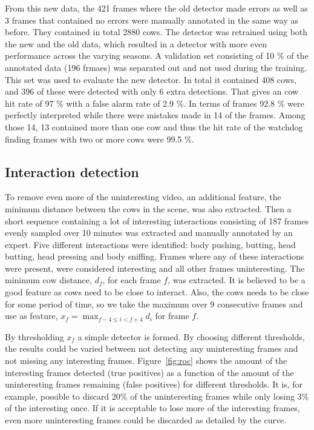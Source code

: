 \documentclass{IET}
\begin{document}
From this new data, the 421 frames where the old detector made errors as well as 3 frames that contained no errors were manually annotated in the same way as before. They contained in total 2880 cows. The detector was retrained using both the new and the old data, which resulted in a detector with more even performance across the varying seasons. A validation set consisting of 10 \% of the annotated data (196 frmaes) was separated out and not used during the training. This set was used to evaluate the new detector. In total it contained 408 cows, and 396 of these were detected with only 6 extra detections. That gives an cow hit rate of 97 \% with a false alarm rate of 2.9 \%. In terms of frames 92.8 \% were perfectly interpreted while there were mistakes made in 14 of the frames. Among those 14, 13 contained more than one cow and thus the hit rate of the watchdog finding frames with two or more cows were 99.5 \%.

\subsection{Interaction detection}
To remove even more of the uninteresting video, an additional feature, the minimum distance between the cows in the scene, was also extracted. Then a short sequence containing a lot of interesting interactions consisting of 187 frames evenly sampled over 10 minutes was extracted and manually annotated by an expert. Five different interactions were identified: body pushing, butting, head butting, head pressing and body sniffing. Frames where any of these interactions were present, were considered interesting and all other frames uninteresting. The minimum cow distance, $d_f$, for each frame $f$, was extracted. It is believed to be a good feature as cows need to be close to interact. Also, the cows needs to be close for some period of time, so we take the maximum over 9 consecutive frames and use as feature, 
$x_f = \max_{f-4 \leq i < f+4} d_i$ for frame $f$.

By thresholding $x_f$ a simple detector is formed. By choosing different thresholds, the results could be varied between not detecting any uninteresting frames and not missing any interesting frames. Figure~\ref{fig:roc} shows the amount of the interesting frames detected (true positives) as a function of the amount of the uninteresting frames remaining (false positives) for different thresholds. It is, for example, possible to discard 20\% of the uninteresting frames while only losing 3\% of the interesting once. If it is acceptable to lose more of the interesting frames, even more uninteresting frames could be discarded as detailed by the curve.
\end{document}
